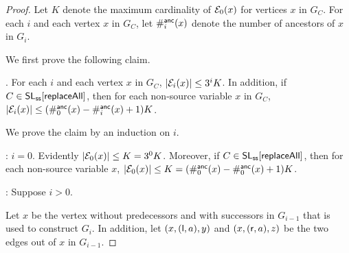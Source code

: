 \begin{proof}
%
Let $K$ denote the maximum cardinality of $\mathcal{E}_0(x)$ for vertices $x$ in $G_C$. 
For each $i$ and each vertex $x$ in $G_C$, let  $\#^{\sf anc}_i(x)$ denote the number of ancestors of $x$ in $G_i$.




We first prove the following claim.

\smallskip

. For each $i$ and each vertex $x$ in $G_C$, 
$|\mathcal{E}_i(x)| \le 3^i K$. In addition, if $C \in \mathsf{SL}_{\sf ss}[\mathsf{replaceAll}]$, then for each non-source variable $x$ in $G_C$, $|\mathcal{E}_i(x)| \le (\#^{\sf anc}_0(x)-\#^{\sf anc}_i(x)+1) K$.

\smallskip

We prove the claim by an induction on $i$.

\smallskip


: $i=0$. Evidently $|\mathcal{E}_0(x)| \le K = 3^0 K$. Moreover, if $C \in \mathsf{SL}_{\sf ss}[\mathsf{replaceAll}]$, then for each non-source variable $x$, $|\mathcal{E}_0(x)| \le K = (\#^{\sf anc}_0(x)-\#^{\sf anc}_0(x)+1) K$.

\smallskip

: 
Suppose $i > 0$.

Let $x$ be the vertex without predecessors and with successors in $G_{i-1}$ that is used to construct $G_{i}$. In addition, let $(x, (\mathsf{l}, a), y)$ and $(x, (\mathsf{r}, a), z)$ be the two edges out of $x$ in $G_{i-1}$.


\end{proof}
